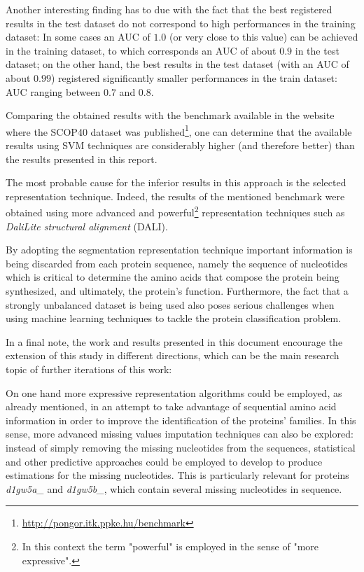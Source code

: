 \documentclass[11pt]{article}
\begin{document}
Another interesting finding has to due with the fact that the best registered results in the test dataset do not correspond to high performances in the training dataset: In some cases an AUC of $1.0$ (or very close to this value) can be achieved in the training dataset, to which corresponds an AUC of about $0.9$ in the test dataset; on the other hand, the best results in the test dataset (with an AUC of about $0.99$) registered significantly smaller performances in the train dataset: AUC ranging between $0.7$ and $0.8$.

Comparing the obtained results with the benchmark available in the website where the SCOP40 dataset was published\footnote{\url{http://pongor.itk.ppke.hu/benchmark}}, one can determine that the available results using SVM techniques are considerably higher (and therefore better) than the results presented in this report.

The most probable cause for the inferior results in this approach is the selected representation technique. Indeed, the results of the mentioned benchmark were obtained using more advanced and powerful\footnote{In this context the term "powerful" is employed in the sense of "more expressive".} representation techniques such as \emph{DaliLite structural alignment} (DALI).

By adopting the segmentation representation technique important information is being discarded from each protein sequence, namely the sequence of nucleotides which is critical to determine the amino acids that compose the protein being synthesized, and ultimately, the protein's function. Furthermore, the fact that a strongly unbalanced dataset is being used also poses serious challenges when using machine learning techniques to tackle the protein classification problem.

In a final note, the work and results presented in this document encourage the extension of this study in different directions, which can be the main research topic of further iterations of this work:

On one hand more expressive representation algorithms could be employed, as already mentioned, in an attempt to take advantage of sequential amino acid information in order to improve the identification of the proteins' families. In this sense, more advanced missing values imputation techniques can also be explored: instead of simply removing the missing nucleotides from the sequences, statistical and other predictive approaches could be employed to develop to produce estimations for the missing nucleotides. This is particularly relevant for proteins \emph{d1gw5a\_} and \emph{d1gw5b\_}, which contain several missing nucleotides in sequence.
\end{document}
